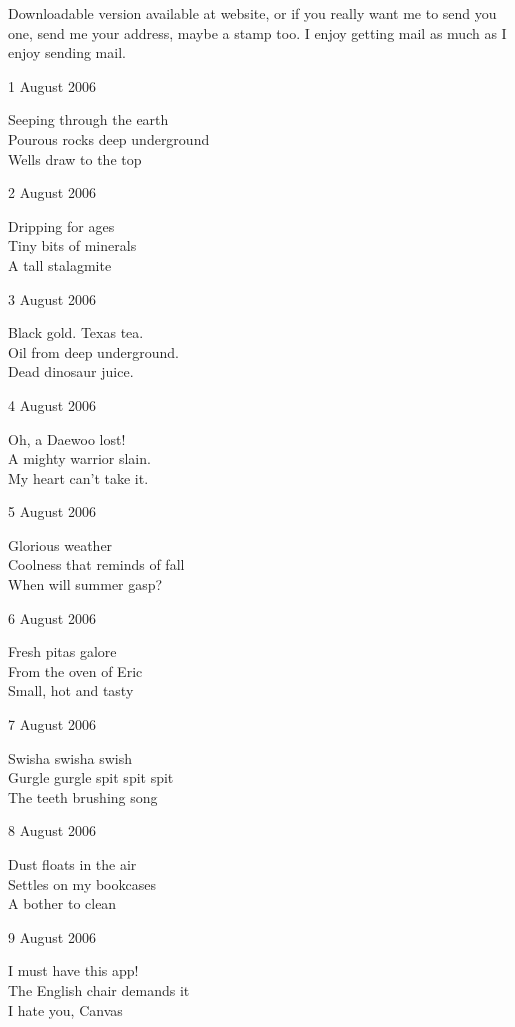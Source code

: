 \documentclass[12pt]{article}
\begin{document}
Downloadable version available at website, or if you really
want me to send you one, send me your address, maybe a
stamp too. I enjoy getting mail as much as I enjoy sending
mail.\\

\setlength{\parskip}{1mm}

1 August 2006

Seeping through the earth \\
Pourous rocks deep underground \\
Wells draw to the top

\newpage

2 August 2006

Dripping for ages \\
Tiny bits of minerals \\
A tall stalagmite

3 August 2006

Black gold. Texas tea. \\
Oil from deep underground. \\
Dead dinosaur juice.

4 August 2006

Oh, a Daewoo lost! \\
A mighty warrior slain. \\
My heart can't take it.

5 August 2006

Glorious weather \\
Coolness that reminds of fall \\
When will summer gasp?

6 August 2006

Fresh pitas galore \\
From the oven of Eric \\
Small, hot and tasty

7 August 2006

Swisha swisha swish \\
Gurgle gurgle spit spit spit \\
The teeth brushing song


\newpage

8 August 2006

Dust floats in the air \\
Settles on my bookcases \\
A bother to clean

9 August 2006

I must have this app! \\
The English chair demands it \\
I hate you, Canvas
\end{document}
